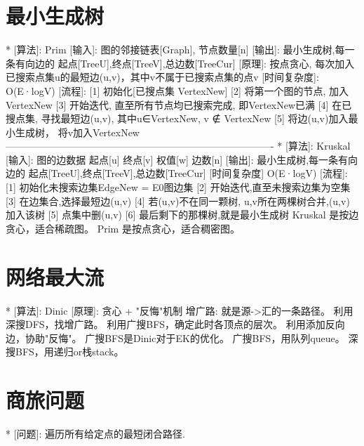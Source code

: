         \section{最小生成树}
        *	[算法]: Prim
                [输入]: 图的邻接链表[Graph], 节点数量[n]
                [输出]: 最小生成树,每一条有向边的 起点[TreeU],终点[TreeV],总边数[TreeCur]
                [原理]: 按点贪心, 每次加入已搜索点集u的最短边(u,v)，其中v不属于已搜索点集的点v
                [时间复杂度]: O(E·logV)
                [流程]:
                    [1] 初始化[已搜点集 VertexNew]
                    [2] 将第一个图的节点, 加入VertexNew
                    [3] 开始迭代, 直至所有节点均已搜索完成, 即VertexNew已满
                        [4] 在已搜点集, 寻找最短边(u,v), 其中u∈VertexNew, v ∉ VertexNew
                        [5] 将边(u,v)加入最小生成树， 将v加入VertexNew
        ----------------------------------------------------------------------------------
        *	[算法]: Kruskal
                [输入]: 图的边数据 起点[u] 终点[v] 权值[w] 边数[n]
                [输出]: 最小生成树,每一条有向边的 起点[TreeU],终点[TreeV],总边数[TreeCur]
                [时间复杂度] O(E·logV)
                [流程]:
                    [1] 初始化未搜索边集EdgeNew = E0图边集
                    [2] 开始迭代,直至未搜索边集为空集
                        [3] 在边集合,选择最短边(u,v)
                        [4] 若(u,v)不在同一颗树, u,v所在两棵树合并,(u,v)加入该树
                        [5] 点集中删(u,v)
                    [6] 最后剩下的那棵树,就是最小生成树
                Kruskal	是按边贪心，适合稀疏图。
                Prim	是按点贪心，适合稠密图。

        \section{网络最大流}
        *	[算法]: Dinic
                [原理]: 贪心 + "反悔"机制
                增广路: 就是源->汇的一条路径。
                    利用深搜DFS，找增广路。
                    利用广搜BFS，确定此时各顶点的层次。
                    利用添加反向边，协助"反悔"。
                    广搜BFS是Dinic对于EK的优化。
                    广搜BFS，用队列queue。
                    深搜BFS，用递归or栈stack。

        \section{商旅问题}
        *	[问题]: 遍历所有给定点的最短闭合路径.

